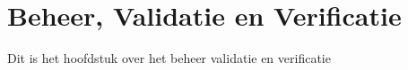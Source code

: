 \chapter{Beheer, Validatie en Verificatie}
Dit is het hoofdstuk over het beheer validatie en verificatie




